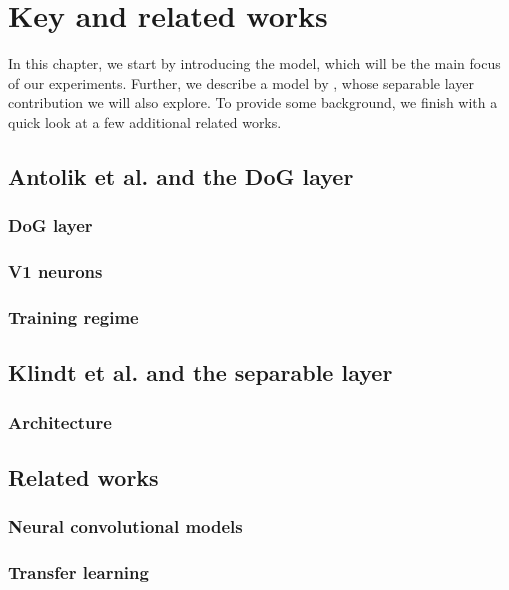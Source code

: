\chapter{Key and related works}\label{ch:related-works}

In this chapter, we start by introducing the \cite{antolik} model, which will be the main focus of our experiments. Further, we describe a model by \cite{klidnt}, whose separable layer contribution we will also explore. To provide some background, we finish with a quick look at a few additional related works.

\section{Antolik et al. and the DoG layer}

\subsection{DoG layer}

\subsection{V1 neurons}

\subsection{Training regime}

\section{Klindt et al. and the separable layer}

\subsection{Architecture}

\section{Related works}

\subsection{Neural convolutional models}

\subsection{Transfer learning}
